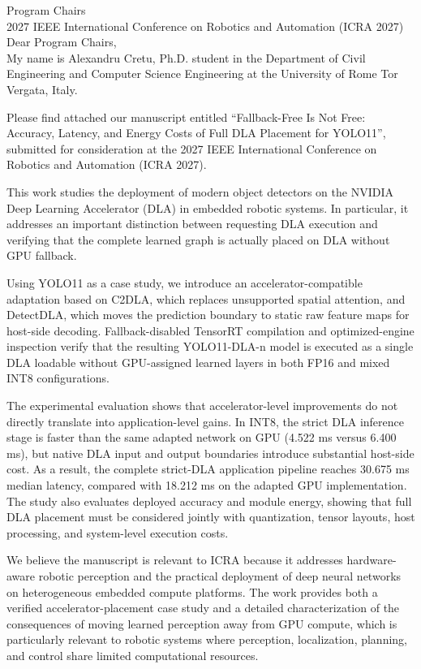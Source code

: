 \documentclass[11pt]{article}
\begin{document}
\noindent Program Chairs\\
2027 IEEE International Conference on Robotics and Automation (ICRA 2027)\\

\noindent Dear Program Chairs,\\

My name is Alexandru Cretu, Ph.D. student in the Department of Civil Engineering and Computer Science Engineering at the University of Rome Tor Vergata, Italy.

Please find attached our manuscript entitled
``Fallback-Free Is Not Free: Accuracy, Latency, and Energy Costs of Full DLA Placement for YOLO11'',
submitted for consideration at the 2027 IEEE International Conference on Robotics and Automation (ICRA 2027).

This work studies the deployment of modern object detectors on the NVIDIA Deep Learning Accelerator (DLA) in embedded robotic systems. In particular, it addresses an important distinction between requesting DLA execution and verifying that the complete learned graph is actually placed on DLA without GPU fallback.

Using YOLO11 as a case study, we introduce an accelerator-compatible adaptation based on C2DLA, which replaces unsupported spatial attention, and DetectDLA, which moves the prediction boundary to static raw feature maps for host-side decoding. Fallback-disabled TensorRT compilation and optimized-engine inspection verify that the resulting YOLO11-DLA-n model is executed as a single DLA loadable without GPU-assigned learned layers in both FP16 and mixed INT8 configurations.

The experimental evaluation shows that accelerator-level improvements do not directly translate into application-level gains. In INT8, the strict DLA inference stage is faster than the same adapted network on GPU (4.522 ms versus 6.400 ms), but native DLA input and output boundaries introduce substantial host-side cost. As a result, the complete strict-DLA application pipeline reaches 30.675 ms median latency, compared with 18.212 ms on the adapted GPU implementation. The study also evaluates deployed accuracy and module energy, showing that full DLA placement must be considered jointly with quantization, tensor layouts, host processing, and system-level execution costs.

We believe the manuscript is relevant to ICRA because it addresses hardware-aware robotic perception and the practical deployment of deep neural networks on heterogeneous embedded compute platforms. The work provides both a verified accelerator-placement case study and a detailed characterization of the consequences of moving learned perception away from GPU compute, which is particularly relevant to robotic systems where perception, localization, planning, and control share limited computational resources.
\end{document}
